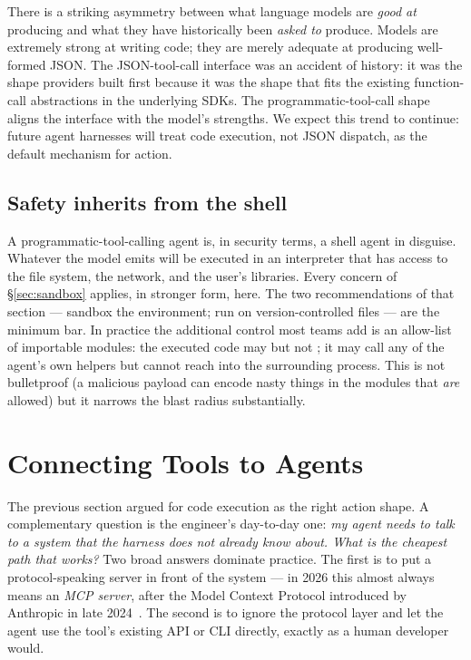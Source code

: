 \begin{remarkbox}
\small
There is a striking asymmetry between what language models are
\emph{good at} producing and what they have historically been
\emph{asked to} produce. Models are extremely strong at writing
code; they are merely adequate at producing well-formed JSON. The
JSON-tool-call interface was an accident of history: it was the
shape providers built first because it was the shape that fits the
existing function-call abstractions in the underlying SDKs. The
programmatic-tool-call shape aligns the interface with the model's
strengths. We expect this trend to continue: future agent harnesses
will treat code execution, not JSON dispatch, as the default
mechanism for action.
\end{remarkbox}

\subsection{Safety inherits from the shell}
\label{sec:codeact-safety}

A programmatic-tool-calling agent is, in security terms, a shell
agent in disguise. Whatever the model emits will be executed in an
interpreter that has access to the file system, the network, and
the user's libraries. Every concern of \S\ref{sec:sandbox} applies,
in stronger form, here. The two recommendations of that section ---
sandbox the environment; run on version-controlled files --- are
the minimum bar. In practice the additional control most teams add
is an allow-list of importable modules: the executed code may
 but not ; it may call any
of the agent's own helpers but cannot reach into the surrounding
process. This is not bulletproof (a malicious payload can encode
nasty things in the modules that \emph{are} allowed) but it
narrows the blast radius substantially.

\section{Connecting Tools to Agents}
\label{sec:mcp}

The previous section argued for code execution as the right action
shape. A complementary question is the engineer's day-to-day one:
\emph{my agent needs to talk to a system that the harness does not
already know about. What is the cheapest path that works?} Two
broad answers dominate practice. The first is to put a
protocol-speaking server in front of the system --- in 2026 this
almost always means an \emph{MCP server}, after the Model Context
Protocol introduced by Anthropic in late
2024~\citep{mcp2024spec,anthropic2025mcpcode}. The second is to
ignore the protocol layer and let the agent use the tool's
existing API or CLI directly, exactly as a human developer would.

